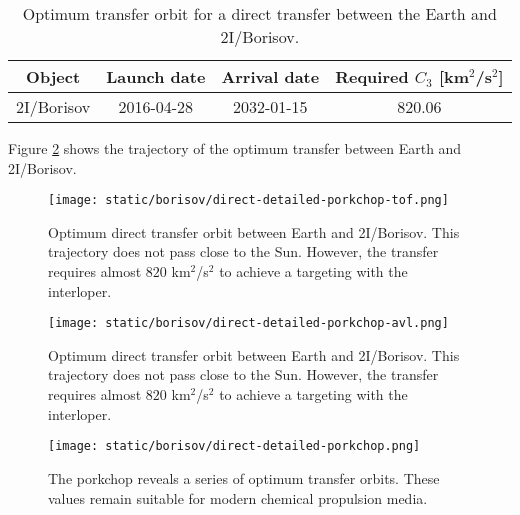 \vspace{1cm}
\begin{table}[H]
  \centering
  \begin{tabular}{|c|c|c|c|}
    \hline
    Object & Launch date & Arrival date & Required $C_3$ [km$^2$/s$^2$] \\
    \hline
    2I/Borisov & 2016-04-28 & 2032-01-15 & 820.06 \\
    \hline
  \end{tabular}
  \caption{Optimum transfer orbit for a direct transfer between the Earth and 2I/Borisov.}
  \label{tab:borisov-direct-transfer-optimum}
\end{table}

Figure \ref{fig:borisov-direct-transfer-orbit} shows the trajectory of the
optimum transfer between Earth and 2I/Borisov.

\begin{figure}[H]
  \centering
  \texttt{[image: static/borisov/direct-detailed-porkchop-tof.png]}
  \caption{Optimum direct transfer orbit between Earth and 2I/Borisov. This
        trajectory does not pass close to the Sun. However, the transfer requires almost $820$
        km$^2$/s$^2$ to achieve a targeting with the interloper.}
  \label{fig:borisov-direct-transfer-orbit}
\end{figure}

\begin{figure}[H]
  \centering
  \texttt{[image: static/borisov/direct-detailed-porkchop-avl.png]}
  \caption{Optimum direct transfer orbit between Earth and 2I/Borisov. This
        trajectory does not pass close to the Sun. However, the transfer requires almost $820$
        km$^2$/s$^2$ to achieve a targeting with the interloper.}
  \label{fig:borisov-direct-transfer-orbit}
\end{figure}

\begin{figure}[H]
  \centering
  \texttt{[image: static/borisov/direct-detailed-porkchop.png]}
        \caption[Detailed porkchop showing the optimum transfer for
        2I/Borisov]{The porkchop reveals a series of optimum transfer orbits.
        These values remain suitable for modern chemical propulsion media.}
  \label{fig:borisov-direct-detailed-porkchop}
\end{figure}
